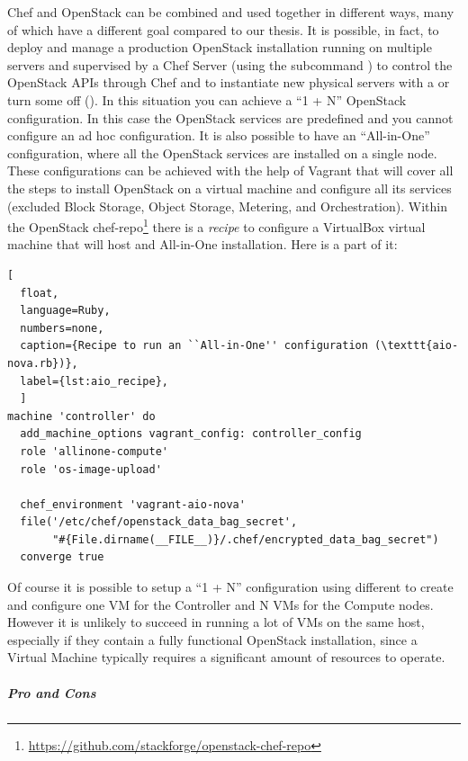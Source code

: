 Chef and OpenStack can be combined and used together in different ways, many of which have a different goal compared to our thesis. It is possible, in fact, to deploy and manage a production OpenStack installation running on multiple servers and supervised by a Chef Server (using the subcommand ) to control the OpenStack APIs through Chef and to instantiate new physical servers with a  or turn some off ().
In this situation you can achieve a ``1 + N'' OpenStack configuration. In this case the OpenStack services are predefined and you cannot configure an ad hoc configuration.
It is also possible to have an ``All-in-One'' configuration, where all the OpenStack services are installed on a single node.\\
These configurations can be achieved with the help of Vagrant that will cover all the steps to install OpenStack on a virtual machine and configure all its services (excluded Block Storage, Object Storage, Metering, and Orchestration). Within the OpenStack chef-repo\footnote{\url{https://github.com/stackforge/openstack-chef-repo}} there is a \textit{recipe} to configure a VirtualBox virtual machine that will host and All-in-One installation. Here is a part of it:

\begin{lstlisting}[
  float,
  language=Ruby,
  numbers=none,
  caption={Recipe to run an ``All-in-One'' configuration (\texttt{aio-nova.rb})},
  label={lst:aio_recipe},
  ]
machine 'controller' do
  add_machine_options vagrant_config: controller_config
  role 'allinone-compute'
  role 'os-image-upload'

  chef_environment 'vagrant-aio-nova'
  file('/etc/chef/openstack_data_bag_secret',
       "#{File.dirname(__FILE__)}/.chef/encrypted_data_bag_secret")
  converge true
\end{lstlisting}

Of course it is possible to setup a ``1 + N'' configuration using different  to create and configure one VM for the Controller and N VMs for the Compute nodes. However it is unlikely to succeed in running a lot of VMs on the same host, especially if they contain a fully functional OpenStack installation, since a Virtual Machine typically requires a significant amount of resources to operate.

\subparagraph{Pro and Cons}
\label{subp:sota_chef_pro_cons}

